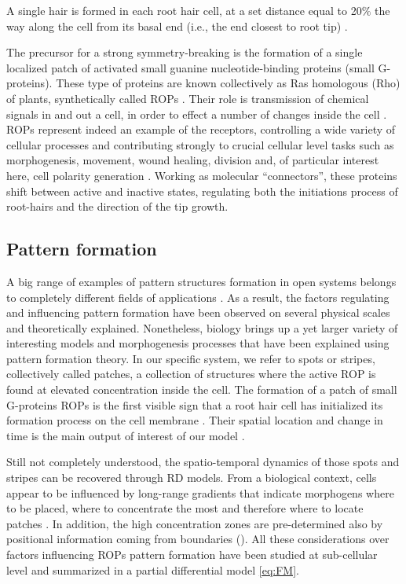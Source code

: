 A single hair is formed in each root hair cell, at a set distance equal to 20$\%$ the way along the cell from its basal end (i.e., the end closest to root tip) \cite{phd:119_root}.

The precursor for a strong symmetry-breaking is the formation of a single localized patch of activated small guanine nucleotide-binding proteins (small G-proteins). These type of proteins are known collectively as Ras homologous (Rho) of plants, synthetically called ROPs \cite{phd:17_GTP, intra2}. Their role is transmission of chemical signals in and out a cell, in order to effect a number of changes inside the cell \cite{phd:67_hill}. ROPs represent indeed an example of the receptors, controlling a wide variety of cellular processes and contributing strongly to crucial cellular level tasks such as morphogenesis, movement, wound healing, division and, of particular interest here, cell polarity generation \cite{phd:102_rop}. Working as molecular “connectors”, these proteins shift between active and inactive states, regulating both the initiations process of root-hairs and the direction of the tip growth.

\subsection{Pattern formation}
A big range of examples of pattern structures formation in open systems belongs to completely different fields of applications \cite{phd:4_pattern}. As a result, the factors regulating and influencing pattern formation have been observed on several physical scales and theoretically explained. Nonetheless, biology brings up a yet larger variety of interesting models and morphogenesis processes that have been explained using pattern formation theory. In our specific system, we refer to spots or stripes, collectively called patches, a collection of structures where the active ROP is found at elevated concentration inside the cell. The formation of a patch of small G-proteins ROPs is the first visible sign that a root hair cell has initialized its formation process on the cell membrane \cite{intra1_R:13_pattern}. Their spatial location and change in time is the main output of interest of our model \cite{intra2:4_victor, payne, intra2:12_GTP}.

Still not completely understood, the spatio-temporal dynamics of those spots and stripes can be recovered through RD models. From a biological context, cells appear to be influenced by long-range gradients that indicate morphogens where to be placed, where to concentrate the most and therefore where to locate patches \cite{intra:Krup}. In addition, the high concentration zones are pre-determined also by positional information coming from boundaries (\cite{jones}). All these considerations over factors influencing ROPs pattern formation have been studied at sub-cellular level and summarized in a partial differential model \eqref{eq:FM}.

